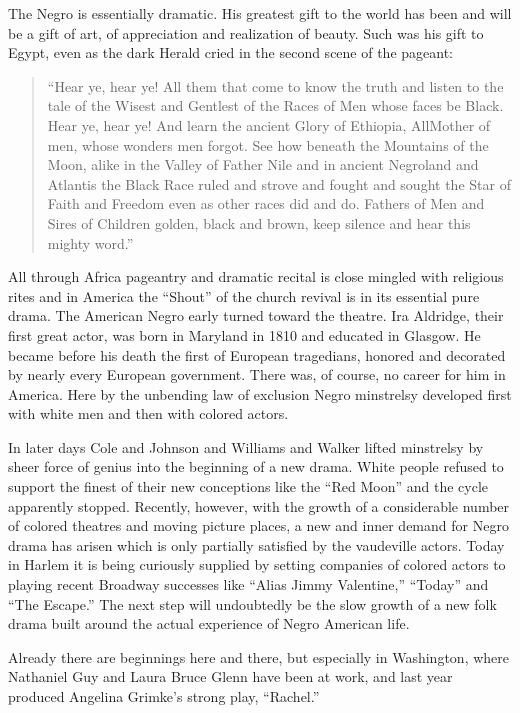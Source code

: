 \documentclass[letterpaper,10pt,english]{jupyterBook}
\begin{document}
\sphinxAtStartPar
The Negro is essentially dramatic. His greatest gift to the world has been and will be a gift of art, of appreciation and realization of beauty. Such was his gift to Egypt, even as the dark Herald cried in the second scene of the pageant:
\begin{quote}

\sphinxAtStartPar
“Hear ye, hear ye! All them that come to know the truth and listen to the tale of the Wisest and Gentlest of the Races of Men whose faces be Black. Hear ye, hear ye! And learn the ancient Glory of Ethiopia, All\sphinxhyphen{}Mother of men, whose wonders men forgot. See how beneath the Mountains of the Moon, alike in the Valley of Father Nile and in ancient Negro\sphinxhyphen{}land and Atlantis the Black Race ruled and strove and fought and sought the Star of Faith and Freedom even as other races did and do. Fathers of Men and Sires of Children golden, black and brown, keep silence and hear this mighty word.”
\end{quote}

\sphinxAtStartPar
All through Africa pageantry and dramatic recital is close mingled with religious rites and in America the “Shout” of the church revival is in its essential pure drama. The American Negro early turned toward the theatre. Ira Aldridge, their first great actor, was born in Maryland in 1810 and educated in Glasgow. He became before his death the first of European tragedians, honored and decorated by nearly every European government. There was, of course, no career for him in America. Here by the unbending law of exclusion Negro minstrelsy developed first with white men and then with colored actors.

\sphinxAtStartPar
In later days Cole and Johnson and Williams and Walker lifted minstrelsy by sheer force of genius into the beginning of a new drama. White people refused to support the finest of their new conceptions like the “Red Moon” and the cycle apparently stopped. Recently, however, with the growth of a considerable number of colored theatres and moving picture places, a new and inner demand for Negro drama has arisen which is only partially satisfied by the vaudeville actors. Today in Harlem it is being curiously supplied by setting companies of colored actors to playing recent Broadway successes like “Alias Jimmy Valentine,” “Today” and “The Escape.” The next step will undoubtedly be the slow growth of a new folk drama built around the actual experience of Negro American life.

\sphinxAtStartPar
Already there are beginnings here and there, but especially in Washington, where Nathaniel Guy and Laura Bruce Glenn have been at work, and last year produced Angelina Grimke’s strong play, “Rachel.”
\end{document}
